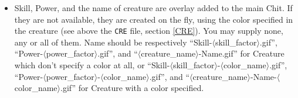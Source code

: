 \documentclass{article}
\begin{document}
\begin{itemize}
\item Skill, Power, and the name of creature are overlay added to the main Chit. If they are not available, they are created on the fly, using the color specified in the creature (see above the \texttt{CRE} file, section \ref{CRE}). You may supply none, any or all of them. Name should be respectively ``Skill-$\langle$skill\_factor$\rangle$.gif'', ``Power-$\langle$power\_factor$\rangle$.gif'', and ``$\langle$creature\_name$\rangle$-Name.gif'' for Creature which don't specify a color at all, or  ``Skill-$\langle$skill\_factor$\rangle$-$\langle$color\_name$\rangle$.gif'', ``Power-$\langle$power\_factor$\rangle$-$\langle$color\_name$\rangle$.gif'', and ``$\langle$creature\_name$\rangle$-Name-$\langle$color\_name$\rangle$.gif'' for Creature with a color specified.

\end{itemize}
\end{document}
